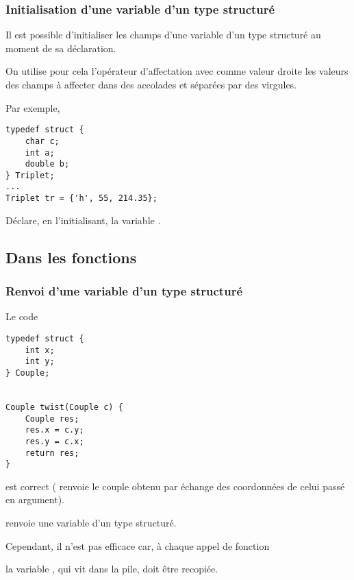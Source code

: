 \begin{frame}[fragile]
\frametitle{Initialisation d'une variable d'un type structuré}
Il est possible d'\alert{initialiser les champs} d'une variable d'un type
structuré au moment de sa \alert{déclaration}.
\medskip

On utilise pour cela l'opérateur d'affectation \Code{=} avec comme valeur
droite les valeurs des champs à affecter dans des accolades et séparées
par des virgules.
\medskip

Par exemple,
\begin{multicols}{2}
\begin{lstlisting}
typedef struct {
    char c;
    int a;
    double b;
} Triplet;
...
Triplet tr = {'h', 55, 214.35};
\end{lstlisting}
\bigskip

Déclare, en l'initialisant, la variable .
\begin{center}
\end{center}
\bigskip
\bigskip
\end{multicols}
\end{frame}

\subsection{Dans les fonctions}

\begin{frame}[fragile]
\frametitle{Renvoi d'une variable d'un type structuré}
Le code
\begin{multicols}{2}
\begin{lstlisting}
typedef struct {
    int x;
    int y;
} Couple;


Couple twist(Couple c) {
    Couple res;
    res.x = c.y;
    res.y = c.x;
    return res;
}
\end{lstlisting}
\end{multicols}
est correct ( renvoie le couple obtenu par échange des
coordonnées de celui passé en argument).
\smallskip

 \alert{renvoie} une variable d'un \alert{type structuré}.
\medskip

Cependant, il n'est pas efficace car, à chaque appel de fonction
\begin{center}
\end{center}
la variable , qui vit dans la pile, doit être recopiée.
\end{frame}

